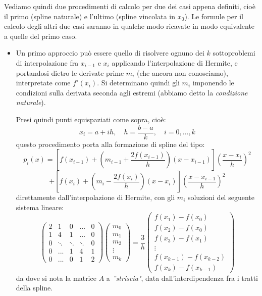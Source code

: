 \documentclass[a4paper,11pt]{article}
\begin{document}
Vediamo quindi due procedimenti di calcolo per due dei casi appena definiti, cioè il primo (spline naturale) e l'ultimo (spline vincolata in $x_0$).
Le formule per il calcolo degli altri due casi saranno in qualche modo ricavate in modo equivalente a quelle del primo caso.
\begin{itemize}
	\item Un primo approccio può essere quello di risolvere ognuno dei $k$ sottoproblemi di interpolazione fra $x_{i - 1}$ e $x_i$ applicando l'interpolazione di Hermite, e portandosi dietro le derivate prime $m_i$ (che ancora non conosciamo), interpretate come $f'(x_i)$.
		Si determinano quindi gli $m_i$ imponendo le condizioni sulla derivata seconda agli estremi (abbiamo detto la \textit{condizione naturale}).

		Presi quindi punti equispaziati come sopra, cioè:
		$$
		x_i = a + ih, \quad h = \frac{b - a}{k}, \quad i = 0, ..., k
		$$
		questo procedimento porta alla formazione di spline del tipo:
		$$
		p_i(x) = \left[ f(x_{i - 1}) + \left( m_{i - 1} + \frac{2 f(x_{i - 1})}{h} \right) (x - x_{i - 1})  \right] \left( \frac{x - x_i}{h} \right)^2
		$$
		$$
		+ \left[ f(x_{i}) + \left( m_{i} - \frac{2 f(x_{i })}{h} \right) (x - x_{i})  \right] \left( \frac{x - x_{i - 1}}{h} \right)^2
		$$
		direttamente dall'interpolazione di Hermite, con gli $m_i$ soluzioni del seguente sistema lineare:
		$$
		\begin{pmatrix}
			2 & 1 & 0 & ... & 0 \\ 
			1 & 4 & 1 & ... & 0 \\
			0 & \ddots & \ddots & \ddots & 0 \\
			0 & ... & 1 & 4 & 1 \\
			0 & ... & 0 & 1 & 2
		\end{pmatrix}
		\begin{pmatrix}
			m_0 \\ m_1 \\ m_2 \\ \vdots \\ m_k
		\end{pmatrix}
		=
		\frac{3}{h}
		\begin{pmatrix}
			f(x_1) - f(x_0) \\
			f(x_2) - f(x_0) \\
			f(x_3) - f(x_1) \\
			\vdots \\
			f(x_{k-1}) - f(x_{k-2}) \\
			f(x_k) - f(x_{k-1})
		\end{pmatrix}
		$$
		da dove si nota la matrice $A$ a \textit{˝striscia"}, data dall'interdipendenza fra i tratti della spline.


\end{itemize}
\end{document}
